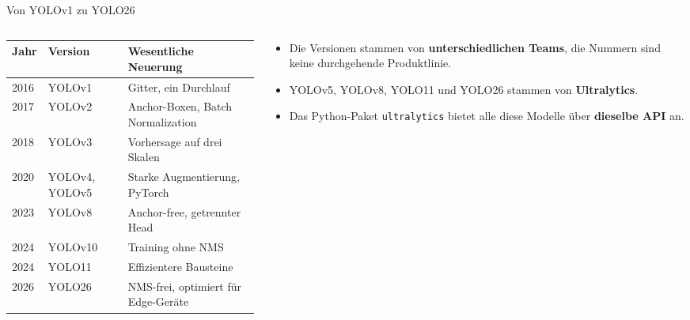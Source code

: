 \begin{frame}{Von YOLOv1 zu YOLO26}
\footnotesize
\begin{columns}
\begin{column}{0.60\textwidth}
\centering
\begin{tabular}{lll}
\toprule
\textbf{Jahr} & \textbf{Version} & \textbf{Wesentliche Neuerung} \\
\midrule
2016 & YOLOv1 & Gitter, ein Durchlauf \\
2017 & YOLOv2 & Anchor-Boxen, Batch Normalization \\
2018 & YOLOv3 & Vorhersage auf drei Skalen \\
2020 & YOLOv4, YOLOv5 & Starke Augmentierung, PyTorch \\
2023 & YOLOv8 & Anchor-free, getrennter Head \\
2024 & YOLOv10 & Training ohne NMS \\
2024 & YOLO11 & Effizientere Bausteine \\
2026 & YOLO26 & NMS-frei, optimiert für Edge-Geräte \\
\bottomrule
\end{tabular}
\end{column}
\begin{column}{0.35\textwidth}
\begin{itemize}
  \item Die Versionen stammen von \textbf{unterschiedlichen Teams}, die Nummern sind keine durchgehende Produktlinie.
  \item YOLOv5, YOLOv8, YOLO11 und YOLO26 stammen von \textbf{Ultralytics}.
  \item Das Python-Paket \texttt{ultralytics} bietet alle diese Modelle über \textbf{dieselbe API} an.
\end{itemize}
\end{column}
\end{columns}
\end{frame}

